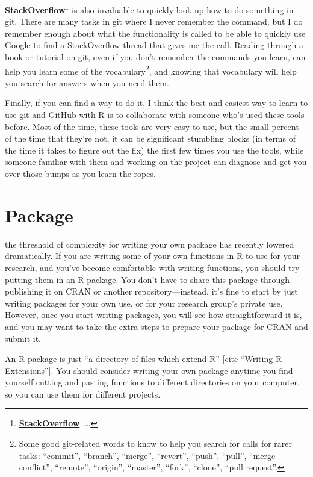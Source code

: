 \documentclass[]{tufte-book}
\begin{document}
\href{https://stackoverflow.com/}{\textbf{StackOverflow}}\footnote{\href{https://stackoverflow.com/}{\textbf{StackOverflow}}.
  \ldots{}}
is also invaluable to quickly look up how to do something in git. There are
many tasks in git where I never remember the command, but I do remember enough about what
the functionality is called to be able to quickly use Google to find a StackOverflow thread
that gives me the call. Reading through a book or tutorial on git, even if you don't
remember the commands you learn, can help you learn some of the vocabulary\footnote{Some good git-related
  words to know to help you search for calls for rarer tasks: ``commit'', ``branch'', ``merge'', ``revert'',
  ``push'', ``pull'', ``merge conflict'', ``remote'', ``origin'', ``master'', ``fork'', ``clone'', ``pull request''.},
and knowing that vocabulary will help you search for answers when you need them.

Finally, if you can find a way to do it, I think the best and easiest way to learn to use git
and GitHub with R is to collaborate with someone who's used these tools before. Most of the
time, these tools are very easy to use, but the small percent of the time that they're not,
it can be significant stumbling blocks (in terms of the time it takes to figure out the fix)
the first few times you use the tools, while someone familiar with them and working on the
project can diagnose and get you over those bumps as you learn the ropes.

\hypertarget{package}{%
\chapter{Package}\label{package}}

 the threshold of complexity
for writing your own package has recently lowered dramatically. If you are writing
some of your own functions in R to use for your research, and you've become comfortable
with writing functions, you should try putting them in an R package. You don't have
to share this package through publishing it on CRAN or another repository---instead, it's
fine to start by just writing packages for your own use, or for your research group's
private use. However, once you start writing packages, you will see how straightforward
it is, and you may want to take the extra steps to prepare your package for CRAN and
submit it.

An R package is just ``a directory of files which extend R'' {[}cite ``Writing R Extensions''{]}.
You should consider writing your own package anytime you find yourself cutting and pasting
functions to different directories on your computer, so you can use them for different
projects.
\end{document}
